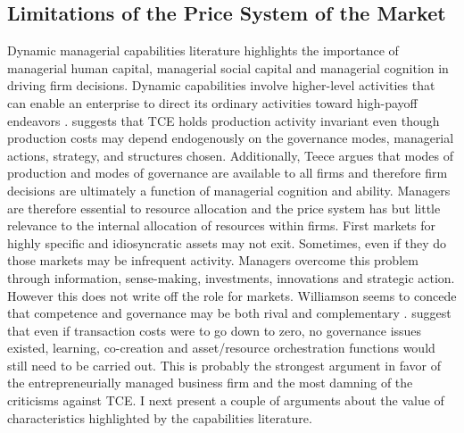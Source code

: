 \documentclass[12pt,letterpaper]{article}
\begin{document}
\subsection{Limitations of the Price System of the Market}
Dynamic managerial capabilities \citep{Adner2003} literature highlights the importance of managerial human capital, managerial social capital and managerial cognition in driving firm decisions. Dynamic capabilities involve higher-level activities that can enable an enterprise to direct its ordinary activities toward high-payoff endeavors \citep{Teece2014a}. \cite{Teece2014b} suggests that TCE holds production activity invariant even though production costs may depend endogenously on the governance modes, managerial actions, strategy, and structures chosen. Additionally, Teece argues that modes of production and modes of governance are available to all firms and therefore firm decisions are ultimately a function of managerial cognition and ability. Managers are therefore essential to resource allocation and the price system has but little relevance to the internal allocation of resources within firms. First markets for highly specific and idiosyncratic assets may not exit. Sometimes, even if they do those markets may be infrequent activity. Managers overcome this problem through information, sense-making, investments, innovations and strategic action. However this does not write off the role for markets. Williamson seems to concede that competence and governance may be both rival and complementary \citep{Williamson1999}.  \cite{Pitelis2009} suggest that even if transaction costs were to go down to zero, no governance issues existed, learning, co-creation and asset/resource orchestration functions would still need to be carried out. This is probably the strongest argument in favor of the  entrepreneurially managed business firm and the most damning of the criticisms against TCE. I next present a couple of arguments about the value of characteristics highlighted by the capabilities literature.
\end{document}

